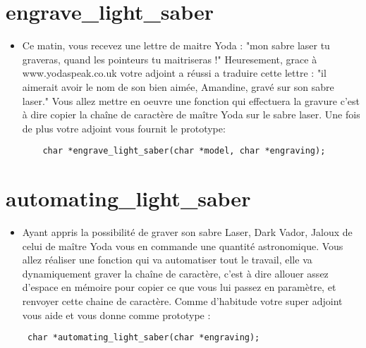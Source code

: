 \documentclass{koala-en}
\begin{document}
\newpage
\chapter{engrave\_light\_saber}


\begin{itemize}
  \item
Ce matin, vous recevez une lettre de maitre Yoda :
"mon sabre laser tu graveras, quand les pointeurs tu maitriseras !"
Heuresement, grace à www.yodaspeak.co.uk votre adjoint a réussi a traduire cette lettre :
"il aimerait avoir le nom de son bien aimée, Amandine, gravé sur son sabre laser."
Vous allez mettre en oeuvre une fonction qui effectuera la gravure c'est à dire copier la chaîne de caractère de maître Yoda sur le sabre laser.
Une fois de plus votre adjoint vous fournit le prototype:
\begin{lstlisting}
    char *engrave_light_saber(char *model, char *engraving); 
\end{lstlisting}
\end{itemize}

\newpage
\chapter{automating\_light\_saber}


\begin{itemize}
  \item
Ayant appris la possibilité de graver son sabre Laser, Dark Vador, Jaloux de celui de maître Yoda vous en commande une quantité astronomique.
Vous allez réaliser une fonction qui va automatiser tout le travail, elle va dynamiquement graver la chaîne de caractère, c'est à dire allouer assez d'espace en mémoire pour copier ce que vous lui passez en paramètre, et renvoyer cette chaine de caractère. Comme d'habitude votre super adjoint vous aide
et vous donne comme prototype : 
\begin{lstlisting}
 char *automating_light_saber(char *engraving);
\end{lstlisting}
\end{itemize}
\newpage
\end{document}

